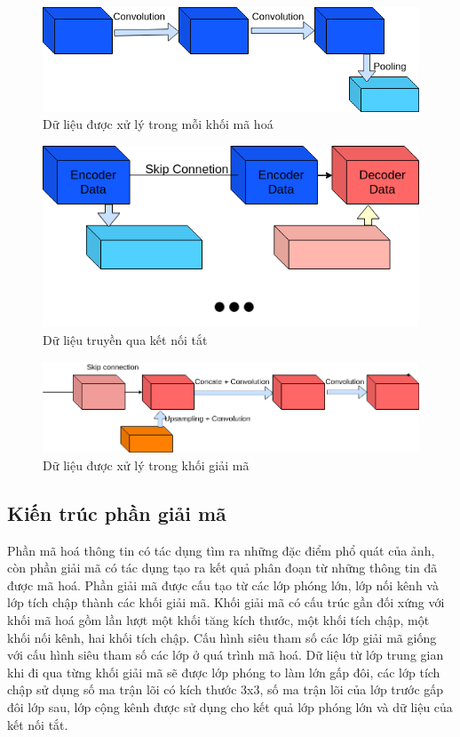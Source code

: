 \begin{figure}[h]
\centering
    \includegraphics[totalheight=3cm]{Images/encoder_block.png}
    \caption{Dữ liệu được xử lý trong mỗi khối mã hoá}
    \label{skip_conn}
\end{figure}

\begin{figure}[h]
\centering
    \includegraphics[totalheight=4.5cm]{Images/skip_conn.png}
    \caption{Dữ liệu truyền qua kết nối tắt}
    \label{skip_conn}
\end{figure}

\begin{figure}[h]
\centering
    \includegraphics[totalheight=3.45cm]{Images/decoder_block.png}
    \caption{Dữ liệu được xử lý trong khối giải mã}
    \label{skip_conn}
\end{figure}

\subsection{Kiến trúc phần giải mã}
Phần mã hoá thông tin có tác dụng tìm ra những đặc điểm phổ quát của ảnh, còn phần giải mã có tác dụng tạo ra kết quả phân đoạn từ những thông tin đã được mã hoá. Phần giải mã được cấu tạo từ các lớp phóng lớn, lớp nối kênh và lớp tích chập thành các khối giải mã. Khối giải mã có cấu trúc gần đối xứng với khối mã hoá gồm lần lượt một khối tăng kích thước, một khối tích chập, một khối nối kênh, hai khối tích chập. Cấu hình siêu tham số các lớp giải mã giống với cấu hình siêu tham số các lớp ở quá trình mã hoá. Dữ liệu từ lớp trung gian khi đi qua từng khối giải mã sẽ được lớp phóng to làm lớn gấp đôi, các lớp tích chập sử dụng số ma trận lõi có kích thước 3x3, số ma trận lõi của lớp trước gấp đôi lớp sau, lớp cộng kênh được sử dụng cho kết quả lớp phóng lớn và dữ liệu của kết nối tắt.

